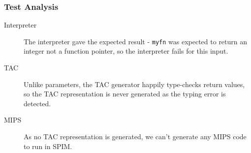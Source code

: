 \subsubsection{Test Analysis}
\begin{description}
	\item[Interpreter] The interpreter gave the expected result - \verb!myfn! was expected to return an integer not a function pointer, so the interpreter fails for this input.
	\item[TAC] Unlike parameters, the TAC generator happily type-checks return values, so the TAC representation is never generated as the typing error is detected.
	\item[MIPS] As no TAC representation is generated, we can't generate any MIPS code to run in SPIM.
\end{description}
